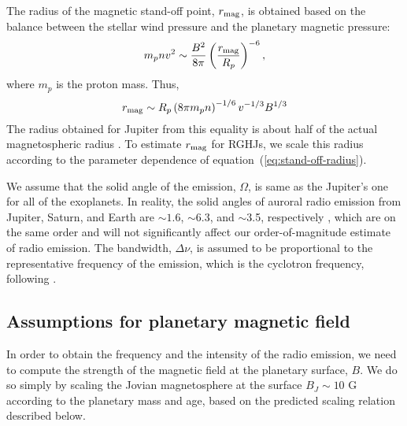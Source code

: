 \documentclass[iop,numberedappendix,apj]{emulateapj}
\begin{document}
The radius of the magnetic stand-off point, $r_{\rm mag}$, is obtained based on the balance between the stellar wind pressure and the planetary magnetic pressure: 
\begin{equation}
m_p n v ^2 \sim \frac{B^2}{8\pi}\left( \frac{r_{\rm mag}}{R_p} \right)^{-6}  \label{eq:stand-off} ,
\end{equation}
where $m_p$ is the proton mass. Thus, 
\begin{equation}
r_{\rm mag} \sim R_p \left( 8\pi m_p n \right) ^{-1/6} v^{-1/3} B^{1/3} \label{eq:stand-off-radius} 
\end{equation}
The radius obtained for Jupiter from this equality is about half of the actual magnetospheric radius \citep[][]{griesmeier2005}. 
To estimate $r_{\rm mag}$ for RGHJs, we scale this radius according to the parameter dependence of equation~(\ref{eq:stand-off-radius}). 


We assume that the solid angle of the emission, $\Omega $, is same as the Jupiter's one for all of the exoplanets.
In reality, the solid angles of auroral radio emission from  Jupiter, Saturn, and Earth are $\sim 1.6$, $\sim $6.3, and $\sim $3.5, respectively \citep{desch+kaiser1984}, which are on the same order and will not significantly affect our order-of-magnitude estimate of radio emission. 
The bandwidth, $\Delta \nu$, is assumed to be proportional to the representative frequency of the emission, which is the cyclotron frequency, following \citet{griesmeier2007b}.


\subsection{Assumptions for planetary magnetic field}
\label{ss:magneticfield}

In order to obtain the frequency and the intensity of the radio emission, we need to compute the strength of the magnetic field at the planetary surface, $B$. 
We do so simply by scaling the Jovian magnetosphere at the surface $B_J \sim 10$ G according to the planetary mass and age, based on the predicted scaling relation described below. 
\end{document}
